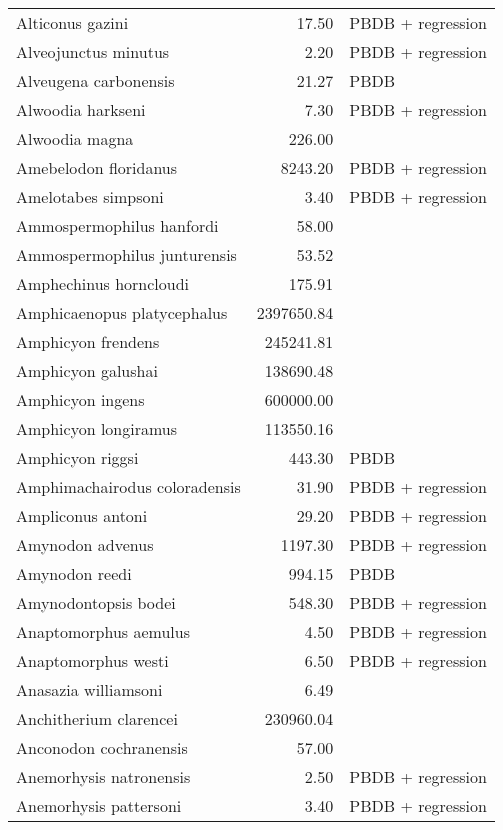 \begin{table}[ht]
\begin{tabular}{lrl}
  Alticonus gazini & 17.50 & PBDB + regression \\ 
  Alveojunctus minutus & 2.20 & PBDB + regression \\ 
  Alveugena carbonensis & 21.27 & PBDB \\ 
  Alwoodia harkseni & 7.30 & PBDB + regression \\ 
  Alwoodia magna & 226.00 & \cite{McKenna2011} \\ 
  Amebelodon floridanus & 8243.20 & PBDB + regression \\ 
  Amelotabes simpsoni & 3.40 & PBDB + regression \\ 
  Ammospermophilus hanfordi & 58.00 & \cite{McKenna2011} \\ 
  Ammospermophilus junturensis & 53.52 & \cite{Tomiya2013} \\ 
  Amphechinus horncloudi & 175.91 & \cite{Tomiya2013} \\ 
  Amphicaenopus platycephalus & 2397650.84 & \cite{Tomiya2013} \\ 
  Amphicyon frendens & 245241.81 & \cite{Tomiya2013} \\ 
  Amphicyon galushai & 138690.48 & \cite{Tomiya2013} \\ 
  Amphicyon ingens & 600000.00 & \cite{Sorkin2008} \\ 
  Amphicyon longiramus & 113550.16 & \cite{Tomiya2013} \\ 
  Amphicyon riggsi & 443.30 & PBDB \\ 
  Amphimachairodus coloradensis & 31.90 & PBDB + regression \\ 
  Ampliconus antoni & 29.20 & PBDB + regression \\ 
  Amynodon advenus & 1197.30 & PBDB + regression \\ 
  Amynodon reedi & 994.15 & PBDB \\ 
  Amynodontopsis bodei & 548.30 & PBDB + regression \\ 
  Anaptomorphus aemulus & 4.50 & PBDB + regression \\ 
  Anaptomorphus westi & 6.50 & PBDB + regression \\ 
  Anasazia williamsoni & 6.49 & \cite{Williamson2012} \\ 
  Anchitherium clarencei & 230960.04 & \cite{Tomiya2013} \\ 
  Anconodon cochranensis & 57.00 & \cite{Wilson2012} \\ 
  Anemorhysis natronensis & 2.50 & PBDB + regression \\ 
  Anemorhysis pattersoni & 3.40 & PBDB + regression \\ 

\end{tabular}
\end{table}
